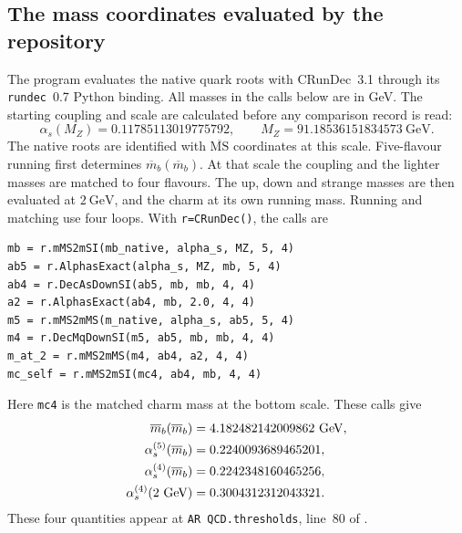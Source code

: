 \documentclass[aps,prx,onecolumn,10pt,notitlepage,nofootinbib,longbibliography]{revtex4-2}
\numberwithin{equation}{section}
\numberwithin{table}{section}
\begin{document}
\subsection{The mass coordinates evaluated by the repository}
\label{sec:qcd-repository-protocol}\label{sec:quarkconversions}
The program  evaluates the native quark roots
with CRunDec~3.1\cite{RunDec,CRunDec} through its \texttt{rundec}~0.7 Python binding. All masses in
the calls below are in GeV. The starting coupling and scale are calculated
before any comparison record is read:
\begin{equation}
 \alpha_s(M_Z)=0.11785113019775792,\qquad
 M_Z=91.18536151834573\ \mathrm{GeV}.
\end{equation}
The native roots are identified with $\overline{\mathrm{MS}}$ coordinates at
this scale. Five-flavour running first determines
$\overline m_b(\overline m_b)$. At that scale the coupling and the lighter
masses are matched to four flavours. The up, down and strange masses are
then evaluated at $2\ \mathrm{GeV}$, and the charm at its own running mass.
Running and matching use four loops. With \texttt{r=CRunDec()}, the calls are
\begin{verbatim}
mb = r.mMS2mSI(mb_native, alpha_s, MZ, 5, 4)
ab5 = r.AlphasExact(alpha_s, MZ, mb, 5, 4)
ab4 = r.DecAsDownSI(ab5, mb, mb, 4, 4)
a2 = r.AlphasExact(ab4, mb, 2.0, 4, 4)
m5 = r.mMS2mMS(m_native, alpha_s, ab5, 5, 4)
m4 = r.DecMqDownSI(m5, ab5, mb, mb, 4, 4)
m_at_2 = r.mMS2mMS(m4, ab4, a2, 4, 4)
mc_self = r.mMS2mSI(mc4, ab4, mb, 4, 4)
\end{verbatim}
Here \texttt{mc4} is the matched charm mass at the bottom scale. These calls
give
\begin{align}
 \overline m_b(\overline m_b)&=4.182482142009862\ \mathrm{GeV},\notag\\
 \alpha_s^{(5)}(\overline m_b)&=0.2240093689465201,\notag\\
 \alpha_s^{(4)}(\overline m_b)&=0.2242348160465256,\notag\\
 \alpha_s^{(4)}(2\ \mathrm{GeV})&=0.3004312312043321.
\end{align}
These four quantities appear at \texttt{AR QCD.thresholds}, line~80 of
.
\end{document}
